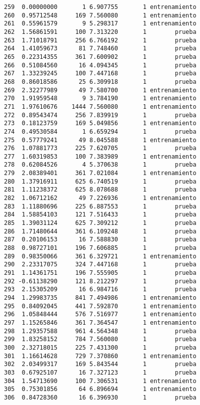 \documentclass[
  letterpaper,
  DIV=11,
  numbers=noendperiod]{scrreprt}
\begin{document}
\begin{verbatim}
259  0.00000000       1 6.907755       1 entrenamiento
260  0.95712548     169 7.560080       1 entrenamiento
261  0.55961579       9 5.298317       1 entrenamiento
262  1.56861591     100 7.313220       1        prueba
263  1.71018791     256 6.766192       1        prueba
264  1.41059673      81 7.748460       1        prueba
265  0.22314355     361 7.600902       1        prueba
266  0.51084560      16 4.094345       1        prueba
267  1.33239245     100 7.447168       1        prueba
268  0.86018586      25 6.309918       1        prueba
269  2.32277989      49 7.580700       1 entrenamiento
270  1.91959548       9 3.784190       1 entrenamiento
271  1.97610676    1444 7.560080       1 entrenamiento
272  0.89543474     256 7.839919       1        prueba
273  0.18123759     169 5.049856       1 entrenamiento
274  0.49530584       1 6.659294       1        prueba
275  0.57779241      49 8.045588       1 entrenamiento
276  1.07881773     225 7.620705       1        prueba
277  1.60319853     100 7.383989       1 entrenamiento
278  0.62084526       4 5.370638       1        prueba
279  2.08389401     361 7.021084       1 entrenamiento
280  1.37916911     625 6.740519       1        prueba
281  1.11238372     625 8.078688       1        prueba
282  1.06712162      49 7.226936       1 entrenamiento
283  1.11880696     225 6.887553       1        prueba
284  1.58854103     121 7.516433       1        prueba
285  1.39031124     625 7.309212       1        prueba
286  1.71480644     361 6.109248       1        prueba
287  0.20106153      16 7.588830       1        prueba
288  0.98727101     196 7.606885       1        prueba
289  0.98350066     361 6.329721       1 entrenamiento
290  2.23317075     324 7.447168       1        prueba
291  1.14361751     196 7.555905       1        prueba
292 -0.61138290     121 8.212297       1        prueba
293  2.15305209      16 6.984716       1        prueba
294  1.29983735     841 7.494986       1 entrenamiento
295  0.84092045     441 7.592870       1 entrenamiento
296  1.05848444     576 7.516977       1 entrenamiento
297  1.15265846     361 7.364547       1 entrenamiento
298  1.29357588     961 4.564348       1        prueba
299  1.83258152     784 7.560080       1        prueba
300  2.32718015     225 7.431300       1        prueba
301  1.16614628     729 7.370860       1 entrenamiento
302  2.03499317     169 5.843544       1        prueba
303  0.67925107      16 7.327123       1        prueba
304  1.54713690     100 7.306531       1 entrenamiento
305  0.75301856      64 6.896694       1 entrenamiento
306  0.84728360      16 6.396930       1        prueba

\end{verbatim}
\end{document}

